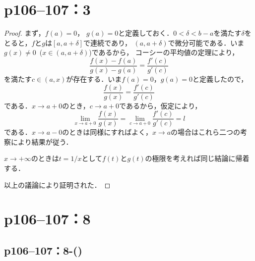 \documentclass[a4paper,10pt,fleqn]{ltjsarticle}
\begin{document}
\newpage
\section*{p106--107：3}

\begin{tleftbar}
    \begin{proof}
        まず，$f(a)=0$， $g(a)=0$と定義しておく．$0<\delta <b-a$を満たす$\delta$をとると，$f$と$g$は$[a,a+\delta]$で連続であり，
        $(a,a+\delta)$で微分可能である．いま$g(x) \ne 0$~($ x \in (a,a+\delta)$)であるから，
        コーシーの平均値の定理により，
        \[
            \frac{f(x)-f(a)}{g(x)-g(a)} = \frac{f'(c)}{g'(c)}
        \]
        を満たす$c \in (a,x)$が存在する．いま$f(a)=0$，$g(a)=0$と定義したので，
        \[
            \frac{f(x)}{g(x)} = \frac{f'(c)}{g'(c)}
        \]
        である．$ x \to a+0$のとき，$c \to a+0$であるから，仮定により，
        \[
            \lim_{x \to a+0} \frac{f(x)}{g(x)} = \lim_{c \to a+0} \frac{f'(c)}{g'(c)} =l
        \]
        である．$ x \to a-0$のときは同様にすればよく，$ x \to a$の場合はこれら二つの考察により結果が従う．

        $ x \to +\infty$のときは$ t=1/x$として$f(t)$と$g(t)$の極限を考えれば同じ結論に帰着する．

        以上の議論により証明された．
    \end{proof}
\end{tleftbar}

\newpage



\section*{p106--107：8}


\subsection*{p106--107：8-()}
\end{document}

